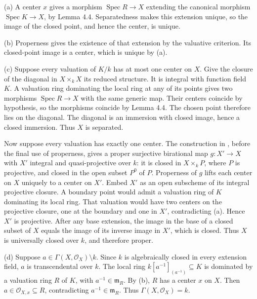 (a) A center $x$ gives a morphism $\operatorname{Spec}R\to X$ extending the canonical morphism $\operatorname{Spec}K\to X$, by Lemma 4.4. Separatedness makes this extension unique, so the image of the closed point, and hence the center, is unique.

(b) Properness gives the existence of that extension by the valuative criterion. Its closed-point image is a center, which is unique by (a).

(c) Suppose every valuation of $K/k$ has at most one center on $X$. Give the closure of the diagonal in $X\times_k X$ its reduced structure. It is integral with function field $K$. A valuation ring dominating the local ring at any of its points gives two morphisms $\operatorname{Spec}R\to X$ with the same generic map. Their centers coincide by hypothesis, so the morphisms coincide by Lemma 4.4. The chosen point therefore lies on the diagonal. The diagonal is an immersion with closed image, hence a closed immersion. Thus $X$ is separated.

Now suppose every valuation has exactly one center. The construction in , before the final use of properness, gives a proper surjective birational map $g:X'\to X$ with $X'$ integral and quasi-projective over $k$: it is closed in $X\times_k P$, where $P$ is projective, and closed in the open subset $P^0$ of $P$. Properness of $g$ lifts each center on $X$ uniquely to a center on $X'$. Embed $X'$ as an open subscheme of its integral projective closure. A boundary point would admit a valuation ring of $K$ dominating its local ring. That valuation would have two centers on the projective closure, one at the boundary and one in $X'$, contradicting (a). Hence $X'$ is projective. After any base extension, the image in the base of a closed subset of $X$ equals the image of its inverse image in $X'$, which is closed. Thus $X$ is universally closed over $k$, and therefore proper.

(d) Suppose $a\in\Gamma(X,\mathcal O_X)\setminus k$. Since $k$ is algebraically closed in every extension field, $a$ is transcendental over $k$. The local ring $k[a^{-1}]_{(a^{-1})}\subseteq K$ is dominated by a valuation ring $R$ of $K$, with $a^{-1}\in\mathfrak m_R$. By (b), $R$ has a center $x$ on $X$. Then $a\in\mathcal O_{X,x}\subseteq R$, contradicting $a^{-1}\in\mathfrak m_R$. Thus $\Gamma(X,\mathcal O_X)=k$.
